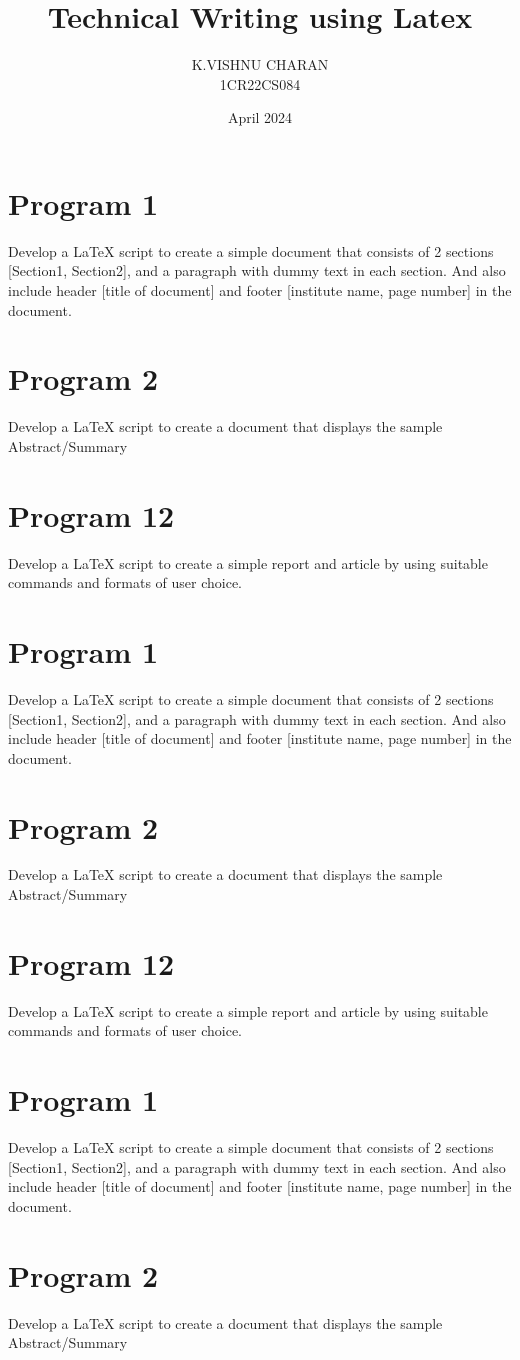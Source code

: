 \documentclass{article}
\title{Technical Writing using Latex}
\author{K.VISHNU CHARAN \\ 1CR22CS084}
\date{April 2024}
\begin{document}
\maketitle
\section{Program 1}
Develop a LaTeX script to create a simple document that consists of 2 sections [Section1, Section2], and a
paragraph with dummy text in each section. And also include header [title of document] and footer
[institute name, page number] in the document.
\section{Program 2}
Develop a LaTeX script to create a document that displays the sample Abstract/Summary
\section{Program 12}
Develop a LaTeX script to create a simple report and article by using suitable commands and formats of
user choice.
\section{Program 1}
Develop a LaTeX script to create a simple document that consists of 2 sections [Section1, Section2], and a
paragraph with dummy text in each section. And also include header [title of document] and footer
[institute name, page number] in the document.
\section{Program 2}
Develop a LaTeX script to create a document that displays the sample Abstract/Summary
\section{Program 12}
Develop a LaTeX script to create a simple report and article by using suitable commands and formats of
user choice.
\section{Program 1}
Develop a LaTeX script to create a simple document that consists of 2 sections [Section1, Section2], and a
paragraph with dummy text in each section. And also include header [title of document] and footer
[institute name, page number] in the document.
\section{Program 2}
Develop a LaTeX script to create a document that displays the sample Abstract/Summary
\end{document}
